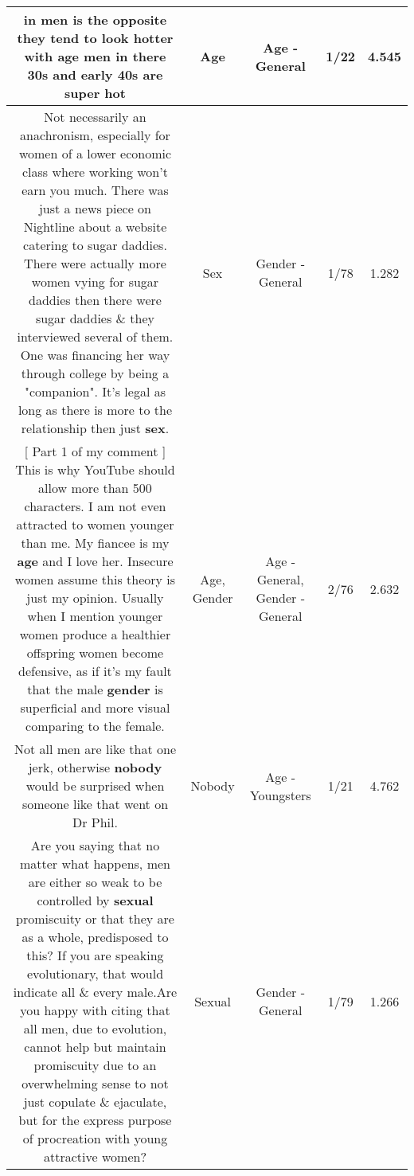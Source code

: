 \documentclass[11pt]{article}
\newlength\mylength
\begin{document}
\begin{center}
\begin{longtable}{|C{.65\mylength}|C{.30\mylength}|C{.12\mylength}|C{.12\mylength}|C{.12\mylength}|}
  \small in men is the opposite they tend to look hotter with \textbf{age} men in there 30s and early 40s are super hot\normalsize   & Age & Age - General & 1/22 & 4.545 \\  \hline
  \small Not necessarily an anachronism, especially for women of a lower economic class where working won't earn you much.  There was just a news piece on Nightline about a website catering to sugar daddies.  There were actually more women vying for  sugar daddies then there were sugar daddies \& they interviewed several of them.  One was financing her way through college by being a "companion".  It's legal as long as there is more to the relationship then just \textbf{sex}.\normalsize   & Sex & Gender - General & 1/78 & 1.282 \\  \hline
  \small [ Part 1 of my comment ] This is why YouTube should allow more than 500 characters. I am not even attracted to women younger than me. My fiancee is my \textbf{age} and I love her. Insecure women assume this theory is just my opinion. Usually when I mention younger women produce a healthier offspring women become defensive, as if it's my fault that the male \textbf{gender} is superficial and more visual comparing to the female.\normalsize   & Age, Gender & Age - General, Gender - General & 2/76 & 2.632 \\  \hline
  \small Not all men are like that one jerk, otherwise \textbf{nobody} would be surprised when someone like that went on Dr Phil.\normalsize   & Nobody & Age - Youngsters & 1/21 & 4.762 \\  \hline
  \small Are you saying that no matter what happens, men are either so weak to be controlled by \textbf{sexual} promiscuity or that they are as a whole, predisposed to this? If you are speaking evolutionary, that would indicate all \& every male.Are you happy with citing that all men, due to evolution, cannot help but maintain promiscuity due to an overwhelming sense to not just copulate \& ejaculate, but for the express purpose of procreation with young attractive women?\normalsize   & Sexual & Gender - General & 1/79 & 1.266 \\  \hline

\end{longtable}
\end{center}
\end{document}
